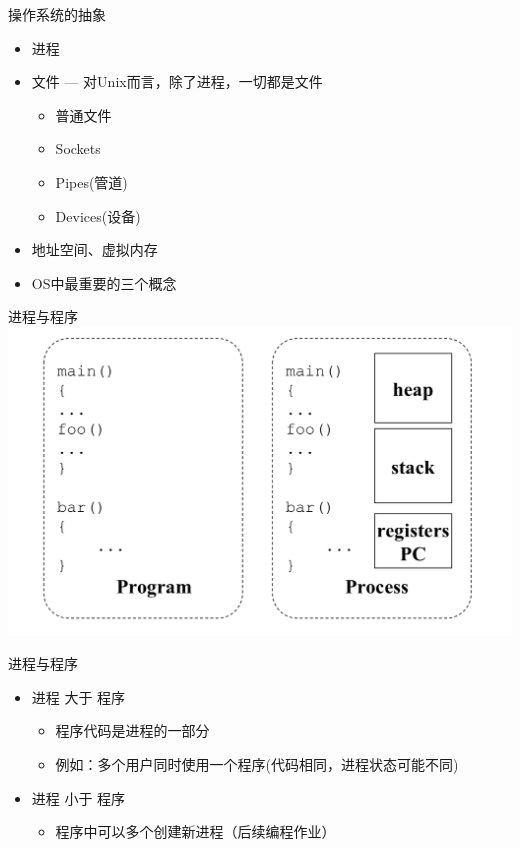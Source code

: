 \documentclass[xcolor=svgnames]{beamer}
\begin{document}
\begin{CJK*}{UTF8}{gbsn}
\begin{frame}{操作系统的抽象}
\begin{itemize}
\item 进程 
\item 文件 --- 对Unix而言，除了进程，一切都是文件
\begin{itemize}
\item 普通文件
\item Sockets
\item Pipes(管道)
\item Devices(设备)
\end{itemize} 
\item 地址空间、虚拟内存
\item OS中最重要的三个概念
\end{itemize} 
\end{frame}

\begin{frame}{进程与程序}
\includegraphics[width=1.0\textwidth]{process.png}
\end{frame}

\begin{frame}{进程与程序}
\begin{itemize}
\item 进程  大于 程序
\begin{itemize}
\item 程序代码是进程的一部分
\item 例如：多个用户同时使用一个程序(代码相同，进程状态可能不同)
\end{itemize} 
\item 进程  小于 程序
\begin{itemize}
\item 程序中可以多个创建新进程（后续编程作业）
\end{itemize} 
\end{itemize} 
\end{frame}


\end{CJK*}
\end{document}
